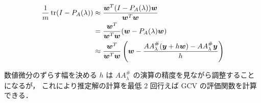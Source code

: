 \begin{align}
    \frac{1}{m} \operatorname{tr}(I - P_A(\lambda))
     & \approx \frac{\bm{w}^T (I - P_A(\lambda)) \bm{w}}{\bm{w}^T \bm{w}}
    \notag                                                                \\
     & = \frac{\bm{w}^T}{\bm{w}^T \bm{w}}(\bm{w} - P_A(\lambda) \bm{w})
    \notag                                                                \\
     & \approx \frac{\bm{w}^T}{\bm{w}^T \bm{w}}
    \left(\bm{w} - \frac{A A_\lambda^\#(\bm{y} + h \bm{w}) - A A_\lambda^\# \bm{y}}{h}\right)
\end{align}

数値微分のずらす幅を決める $h$ は
$A A_\lambda^\#$ の演算の精度を見ながら調整することになるが，
これにより推定解の計算を最低 2 回行えば GCV の評価関数を計算できる．
